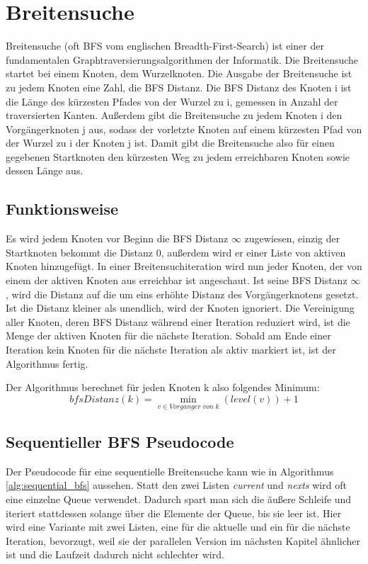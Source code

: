 \section{Breitensuche} %
\label{sec:breitensuche}

Breitensuche (oft BFS vom englischen Breadth-First-Search) ist einer der fundamentalen Graphtraversierungsalgorithmen der Informatik. Die Breitensuche startet bei einem Knoten, dem Wurzelknoten. Die Ausgabe der Breitensuche ist zu jedem Knoten eine Zahl, die BFS Distanz. Die BFS Distanz des Knoten i ist die Länge des kürzesten Pfades von der Wurzel zu i, gemessen in Anzahl der traversierten Kanten. Außerdem gibt die Breitensuche zu jedem Knoten i den Vorgängerknoten j aus, sodass der vorletzte Knoten auf einem kürzesten Pfad von der Wurzel zu i der Knoten j ist. Damit gibt die Breitensuche also für einen gegebenen Startknoten den kürzesten Weg zu jedem erreichbaren Knoten sowie dessen Länge aus.

\subsection{Funktionsweise} %
\label{sub:funktionsweise}
Es wird jedem Knoten vor Beginn die BFS Distanz $ \infty $ zugewiesen, einzig der Startknoten bekommt die Distanz 0, außerdem wird er einer Liste von aktiven Knoten hinzugefügt. In einer Breitensuchiteration wird nun jeder Knoten, der von einem der aktiven Knoten aus erreichbar ist angeschaut. Ist seine BFS Distanz $ \infty $, wird die Distanz auf die um eins erhöhte Distanz des Vorgängerknotens gesetzt. Ist die Distanz kleiner als unendlich, wird der Knoten ignoriert. Die Vereinigung aller Knoten, deren BFS Distanz während einer Iteration reduziert wird, ist die Menge der aktiven Knoten für die nächste Iteration. Sobald am Ende einer Iteration kein Knoten für die nächste Iteration als aktiv markiert ist, ist der Algorithmus fertig. 

Der Algorithmus berechnet für jeden Knoten k also folgendes Minimum\cite{Hassaan:2010:OUA:1854273.1854341}:
$$
bfsDistanz(k) =  \min_{v \in Vorg\ddot{a}nger \; von \; k} (level(v))+1
$$


\subsection{Sequentieller BFS Pseudocode} %
\label{sub:sequentieller_bfs_pseudocode}
Der Pseudocode für eine sequentielle Breitensuche kann wie in Algorithmus \ref{alg:sequential_bfs} aussehen. Statt den zwei Listen \textit{current} und \textit{nexts} wird oft eine einzelne Queue verwendet. Dadurch spart man sich die äußere Schleife und iteriert stattdessen solange über die Elemente der Queue, bis sie leer ist. Hier wird eine Variante mit zwei Listen, eine für die aktuelle und ein für die nächste Iteration, bevorzugt, weil sie der parallelen Version im nächsten Kapitel ähnlicher ist und die Laufzeit dadurch nicht schlechter wird.

